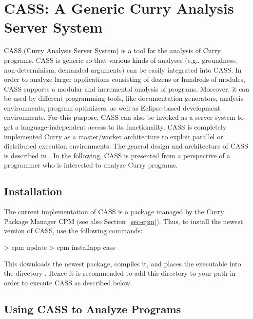 \section{CASS: A Generic Curry Analysis Server System}
\label{sec-cass}

CASS
(Curry Analysis Server System)
is a tool for the analysis of Curry programs.
CASS is generic so that various kinds of analyses (e.g., groundness,
non-determinism, demanded arguments) can be easily integrated into CASS.
In order to analyze larger applications consisting of dozens or hundreds
of modules, CASS supports a modular and incremental analysis of
programs. Moreover, it can be used by different programming tools,
like documentation generators, analysis environments, program
optimizers, as well as Eclipse-based development environments. For
this purpose, CASS can also be invoked as a server system to get a
language-independent access to its functionality. CASS is completely
implemented Curry as a master/worker architecture to exploit parallel
or distributed execution environments.
The general design and architecture of CASS is described
in \cite{HanusSkrlac14}.
In the following, CASS is presented from a perspective
of a programmer who is interested to analyze Curry programs.

\subsection{Installation}

The current implementation of CASS is a package
managed by the Curry Package Manager CPM
(see also Section~\ref{sec-cpm}).
Thus, to install the newest version of CASS, use the following commands:
%
\begin{curry}
> cpm update
> cpm installapp cass
\end{curry}
%
This downloads the newest package, compiles it, and places
the executable  into the directory .
Hence it is recommended to add this directory to your path
in order to execute CASS as described below.

\subsection{Using CASS to Analyze Programs}

